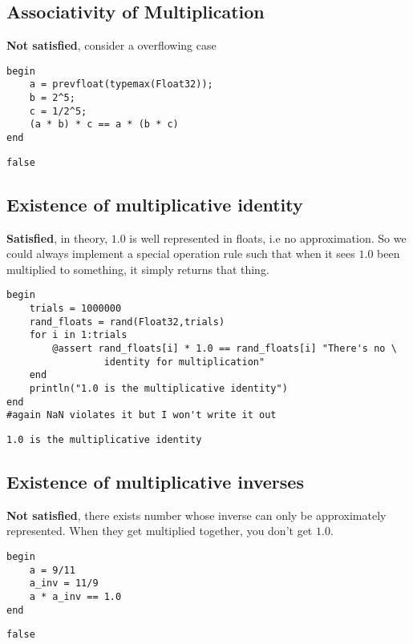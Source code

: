 \documentclass[11pt]{article}
\begin{document}
\subsection{Associativity of Multiplication}
\label{sec:org46d8f5b}
\textbf{Not satisfied}, consider a overflowing case

\begin{verbatim}
begin
    a = prevfloat(typemax(Float32));
    b = 2^5;
    c = 1/2^5;
    (a * b) * c == a * (b * c)
end
\end{verbatim}

\begin{verbatim}
false
\end{verbatim}

\subsection{Existence of multiplicative identity}
\label{sec:org214a172}
\textbf{Satisfied}, in theory, \(1.0\) is well represented in floats, i.e no
approximation. So we could always implement a special operation rule such that
when it sees \(1.0\) been multiplied to something, it simply returns that thing.

\begin{verbatim}
begin
    trials = 1000000
    rand_floats = rand(Float32,trials)
    for i in 1:trials
        @assert rand_floats[i] * 1.0 == rand_floats[i] "There's no \
                 identity for multiplication"
    end
    println("1.0 is the multiplicative identity")
end
#again NaN violates it but I won't write it out
\end{verbatim}

\begin{verbatim}
1.0 is the multiplicative identity
\end{verbatim}

\subsection{Existence of multiplicative inverses}
\label{sec:orgcb1cc3d}
\textbf{Not satisfied}, there exists number whose inverse can only be approximately
represented. When they get multiplied together, you don't get \(1.0\).

\begin{verbatim}
begin
    a = 9/11
    a_inv = 11/9
    a * a_inv == 1.0
end
\end{verbatim}

\begin{verbatim}
false
\end{verbatim}
\end{document}
